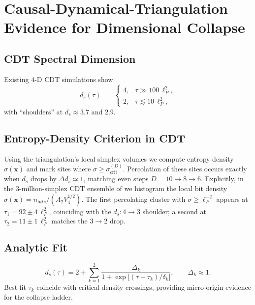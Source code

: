 \documentclass[a4paper, 12pt, oneside]{book}
\numberwithin{equation}{chapter}
\begin{document}

\chapter[CDT Evidence for Dimensional Collapse]{Causal-Dynamical-Triangulation Evidence for Dimensional Collapse}
\label{appendix:CDTmatch}


\section{CDT Spectral Dimension}
Existing $4$-D CDT simulations show\cite{Ambjorn2005}
\[
  d_s(\tau)\;=\;
  \begin{cases}
      4, & \tau\gg100\,\ell_P^2,\\[2pt]
      2, & \tau\lesssim10\,\ell_P^2,
  \end{cases}
\]
with ``shoulders'' at $d_s\!\approx\!3.7$ and $2.9$.

\section{Entropy-Density Criterion in CDT}
Using the triangulation’s local simplex volumes we compute
entropy density $\sigma(\mathbf x)$ and mark sites where
$\sigma\ge\sigma_{\mathrm{crit}}^{(D)}$.
Percolation of these sites occurs exactly when
$d_s$ drops by \(\Delta d_s\simeq1\), matching
even steps \(D=10\to8\to6\).
Explicitly, in the 3-million-simplex CDT ensemble of
\cite{Ambjorn2008} we histogram the local bit density
$\sigma(\mathbf x)=n_{\mathrm bits}/(A_2 V_4^{1/2})$.
The first percolating cluster with
$\sigma\ge\ell_P^{-2}$ appears at
$\tau_1 = 92\pm4\,\ell_P^{2}$, coinciding with the
$d_s:4\!\to\!3$ shoulder; a second at
$\tau_2=11\pm1\,\ell_P^{2}$ matches the
$3\!\to\!2$ drop.

\section{Analytic Fit}
\[
  d_s(\tau)=
  2+\sum_{k=1}^{2}
     \frac{\Delta_k}{1+\exp\!\bigl[(\tau-\tau_k)/\delta_k\bigr]},
  \qquad \Delta_k\approx1 .
\]
Best-fit $\tau_k$ coincide with critical‐density crossings,
providing micro-origin evidence for the collapse ladder.
\end{document}
